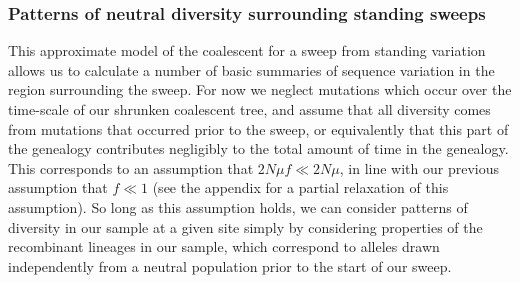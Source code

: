\documentclass[a4paper,10pt]{article}
\newcommand{\jb}[1]{{\it\color{blue} (#1)} }
\begin{document}
\subsubsection*{Patterns of neutral diversity surrounding standing sweeps}
This approximate model of the coalescent for a sweep from standing variation allows us to calculate a number of basic summaries of sequence variation in the region surrounding the sweep. For now we neglect mutations which occur over the time-scale of our shrunken coalescent tree, and assume that all diversity comes from mutations that occurred prior to the sweep, or equivalently that this part of the genealogy contributes negligibly to the total amount of time in the genealogy. This corresponds to an assumption that $2N \mu f \ll 2N\mu$, in line with our previous assumption that $f \ll 1$ (see the appendix for a partial relaxation of this assumption). So long as this assumption holds, we can consider patterns of diversity in our sample at a given site simply by considering properties of the recombinant lineages in our sample, which correspond to alleles drawn independently from a neutral population prior to the start of our sweep.
%
%
%

%
\end{document}
